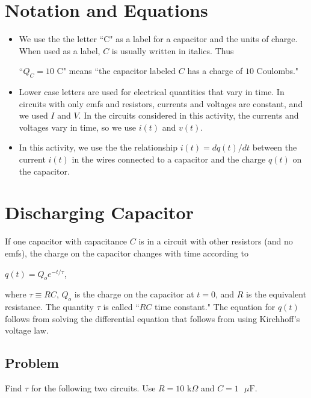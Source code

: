 \documentclass{article}
\begin{document}
\section{Notation and Equations}

\begin{itemize}

  \item We use the the letter ``C" as a label for a capacitor and the units of charge. When used as a label, $C$ is usually written in italics. Thus

        ``$Q_C= 10 \text{ C}$" means ``the capacitor labeled $C$ has a charge of $10$ Coulombs."

  \item Lower case letters are used for electrical quantities that vary in time. In circuits with only emfs and resistors, currents and voltages are constant, and we used $I$ and $V$. In the circuits considered in this activity, the currents and voltages vary in time, so we use $i(t)$ and $v(t)$.

  \item In this activity, we use the the relationship $i(t)=dq(t)/dt$ between the current $i(t)$ in the wires connected to a capacitor and the charge $q(t)$ on the capacitor.

\end{itemize}

\section{Discharging Capacitor}

If one capacitor with capacitance $C$ is in a circuit with other resistors (and no emfs), the charge on the capacitor changes with time according to

$q(t)=Q_oe^{-t/\tau}$,

where $\tau\equiv RC$, $Q_o$ is the charge on the capacitor at $t=0$, and $R$ is the equivalent resistance. The quantity $\tau$ is called ``$RC$ time constant." The equation for $q(t)$ follows from solving the differential equation that follows from using Kirchhoff's voltage law.

\subsection{Problem}

Find $\tau$ for the following two circuits. Use $R=10\text{ k}\Omega$ and $C=1\text{ }\mu\text{F}$.
\end{document}

